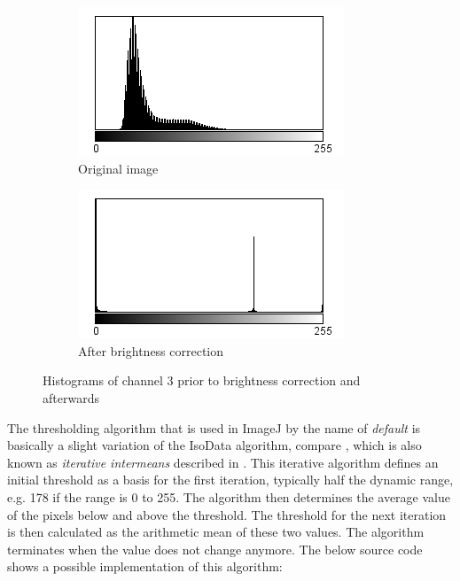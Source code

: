 \documentclass[a4paper, 12pt, twoside]{article}
\begin{document}
\begin{figure}[h]
\centering
\begin{subfigure}[b]{0.4\textwidth}
\includegraphics[width=\textwidth]{images/histogram_original}
\caption{Original image}
\end{subfigure}
\quad
\begin{subfigure}[b]{0.4\textwidth}
\includegraphics[width=\textwidth]{images/histogram_brightness_corrected}
\caption{After brightness correction}
\end{subfigure}
\caption{Histograms of channel 3 prior to brightness correction and afterwards}
\label{fig:example_histograms}
\end{figure}

The thresholding algorithm that is used in ImageJ by the name of
\textit{default} is basically a slight variation of the IsoData algorithm,
compare \cite{landini13}, which is also known as \textit{iterative intermeans} described
in \cite{ridler78}. This iterative algorithm defines an initial threshold as a
basis for the first iteration, typically half the dynamic range, e.g. 178 if
the range is 0 to 255. The algorithm then determines the average value of the
pixels below and above the threshold. The threshold for the next iteration is
then calculated as the  arithmetic mean of these two values. The algorithm
terminates when the value does not change anymore. The below source code shows
a possible implementation of this algorithm:
\end{document}
